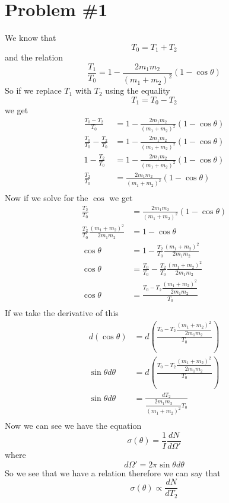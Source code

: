 \documentclass[11pt]{article}
\numberwithin{equation}{section}
\begin{document}


\section{Problem \#1}
We know that 
$$T_0 = T_1+T_2$$
and the relation
$$\frac{T_1}{T_0} = 1 - \frac{2m_1m_2}{(m_1+m_2)^2}(1-\cos\theta)$$
So if we replace $T_1$ with $T_2$ using the equality
$$T_1 = T_0- T_2$$
we get
\begin{align*}
\frac{T_0-T_2}{T_0} &= 1 - \frac{2m_1m_2}{(m_1+m_2)^2}(1-\cos\theta)\\
\frac{T_0}{T_0}-\frac{T_2}{T_0} &= 1 - \frac{2m_1m_2}{(m_1+m_2)^2}(1-\cos\theta)\\
1-\frac{T_2}{T_0} &= 1 - \frac{2m_1m_2}{(m_1+m_2)^2}(1-\cos\theta)\\
\frac{T_2}{T_0} &= \frac{2m_1m_2}{(m_1+m_2)^2}(1-\cos\theta)\\
\end{align*}
Now if we solve for the $\cos$ we get
\begin{align*}
\frac{T_2}{T_0} &= \frac{2m_1m_2}{(m_1+m_2)^2}(1-\cos\theta)\\
\frac{T_2}{T_0}\frac{(m_1+m_2)^2}{2m_1m_2} &= 1-\cos\theta\\
\cos\theta  &= 1-\frac{T_2}{T_0}\frac{(m_1+m_2)^2}{2m_1m_2} \\
\cos\theta  &= \frac{T_0}{T_0}-\frac{T_2}{T_0}\frac{(m_1+m_2)^2}{2m_1m_2} \\
\cos\theta  &= \frac{T_0-T_2\dfrac{(m_1+m_2)^2}{2m_1m_2}}{T_0} \\
\end{align*}
If we take the derivative of this
\begin{align*}
d(\cos\theta) &= d\left(\frac{T_0-T_2\dfrac{(m_1+m_2)^2}{2m_1m_2}}{T_0}\right) \\
\sin\theta d\theta &= d\left(\frac{T_0-T_2\dfrac{(m_1+m_2)^2}{2m_1m_2}}{T_0}\right) \\
\sin\theta d\theta &= \frac{dT_2}{\dfrac{2m_1m_2}{(m_1+m_2)^2}T_0} \\
\end{align*}
Now we can see we have the equation
$$\sigma(\theta) = \frac{1}{I}\frac{dN}{d\Omega'}$$
where
$$d\Omega' = 2\pi\sin\theta d\theta$$
So we see that we have a relation therefore we can say that
$$\sigma(\theta) \varpropto \frac{dN}{dT_2}$$
\end{document}

